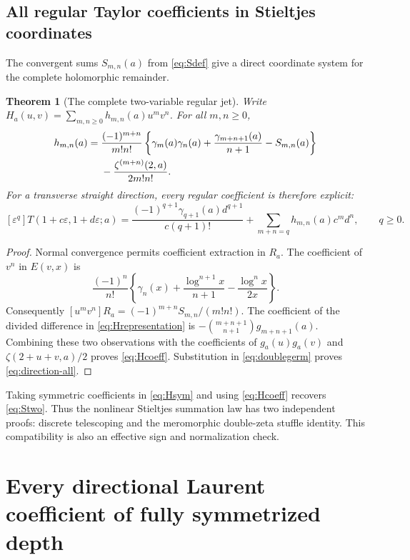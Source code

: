 \documentclass[11pt,letterpaper]{article}
\numberwithin{equation}{section}
\theoremstyle{plain}
\newtheorem{theorem}{Theorem}[section]
\theoremstyle{definition}
\theoremstyle{remark}
\newcommand{\eps}{\varepsilon}
\begin{document}
\subsection{All regular Taylor coefficients in Stieltjes coordinates}

The convergent sums $S_{m,n}(a)$ from \eqref{eq:Sdef} give a direct
coordinate system for the complete holomorphic remainder.

\begin{theorem}[The complete two-variable regular jet]\label{thm:Hcoeff}
Write $H_a(u,v)=\sum_{m,n\ge0}h_{m,n}(a)u^mv^n$. For all $m,n\ge0$,
\begin{align}\label{eq:Hcoeff}
 h_{m,n}(a)
 ={}&\frac{(-1)^{m+n}}{m!n!}
 \left\{\gamma_m(a)\gamma_n(a)
          +\frac{\gamma_{m+n+1}(a)}{n+1}-S_{m,n}(a)\right\}\notag\\
 &-\frac{\zeta^{(m+n)}(2,a)}{2m!n!}.
\end{align}
For a transverse straight direction, every regular coefficient is
therefore explicit:
\begin{equation}\label{eq:direction-all}
 [\eps^q]T(1+c\eps,1+d\eps;a)
 =\frac{(-1)^{q+1}\gamma_{q+1}(a)d^{q+1}}{c(q+1)!}
       +\sum_{m+n=q}h_{m,n}(a)c^md^n,
 \qquad q\ge0.
\end{equation}
\end{theorem}
\begin{proof}
Normal convergence permits coefficient extraction in $R_a$. The
coefficient of $v^n$ in $E(v,x)$ is
\[
 \frac{(-1)^n}{n!}\left\{
 \gamma_n(x)+\frac{\log^{n+1}x}{n+1}-\frac{\log^n x}{2x}\right\}.
\]
Consequently $[u^mv^n]R_a=(-1)^{m+n}S_{m,n}/(m!n!)$.
The coefficient of the divided difference in
\eqref{eq:Hrepresentation} is
$-\binom{m+n+1}{n+1}g_{m+n+1}(a)$. Combining these two observations
with the coefficients of $g_a(u)g_a(v)$ and
$\zeta(2+u+v,a)/2$ proves \eqref{eq:Hcoeff}. Substitution in
\eqref{eq:doublegerm} proves \eqref{eq:direction-all}.
\end{proof}

Taking symmetric coefficients in \eqref{eq:Hsym} and using
\eqref{eq:Hcoeff} recovers \eqref{eq:Stwo}. Thus the nonlinear
Stieltjes summation law has two independent proofs: discrete telescoping
and the meromorphic double-zeta stuffle identity. This compatibility is
also an effective sign and normalization check.


\section{Every directional Laurent coefficient of fully symmetrized depth}
\label{sec:symmetric}
\end{document}
